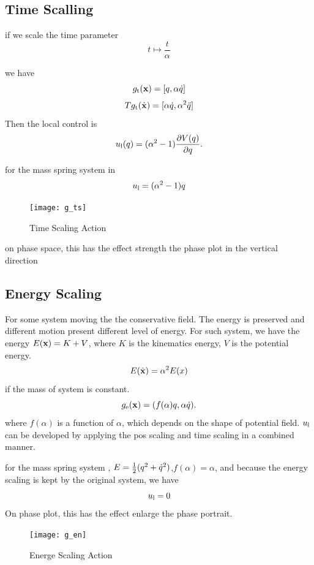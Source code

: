 \subsection*{Time Scalling}

if we scale the time parameter
\[
t \mapsto \frac{t}{\alpha}
\]

we have
\[
g_{\mathrm{t}}(\mathbf{x})=[q,\alpha \dot{q}]
\]
\[
Tg_{\mathrm{t}}(\dot{\mathbf{x}})=[\alpha \dot{q},\alpha^2 \ddot{q}]
\]
Then the local control is 
\begin{equation}
u_{\mathrm{l}}(q) = (\alpha^2 - 1) \frac{\partial V(q)}{\partial q}.
\end{equation}

for the mass spring system in
\[
u_{\mathrm{l}}=(\alpha^2-1)q
\] 

\begin{figure}[!htbp]
  \begin{center}
    \texttt{[image: g\_ts]}
	 \caption{Time Scaling Action}
    \label{fig:gts}
\end{center}
\end{figure}
on phase space, this has the effect strength the phase plot in the vertical direction

\subsection*{Energy Scaling}
For some system moving the the conservative field.
The energy is preserved and different motion present different level of energy.
For such system, we have the energy $E(\mathbf{x})=K+V$, where $K$ is the kinematics energy,
$V$ is the potential energy.
\[
E(\hat{\mathbf{x}})=\alpha^2 E(x)
\]
if the mass of system is constant.
\[
g_{\mathrm{e}}(\mathbf{x})=(f(\alpha) q,\alpha \dot{q}).
\]
where $f(\alpha)$ is a function of $\alpha$, which depends on the shape of potential field.
$u_{\mathrm{l}}$ can be developed by applying the pos scaling and time scaling in a combined manner.



for the mass spring system , $E=\frac{1}{2}(q^2+\dot{q}^2)$,$f(\alpha)=\alpha$, and because the energy scaling is kept by the original system, we have
\[
u_{\mathrm{l}}=0
\]
On phase plot, this has the effect enlarge the phase portrait.

\begin{figure}[!htbp]
  \begin{center}
      \texttt{[image: g\_en]}
    \caption{Energe Scaling Action}
    \label{fig:gen}
\end{center}
\end{figure}


